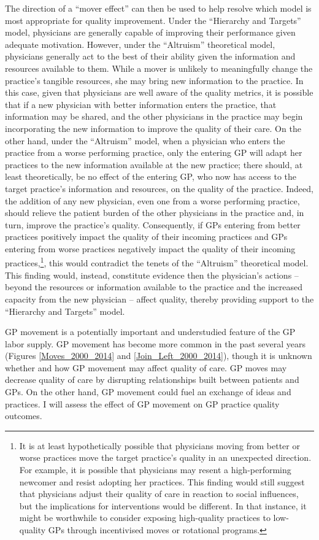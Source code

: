 \documentclass[11pt]{article}
\begin{document}
The direction of a ``mover effect'' can then be used to help resolve which model is most appropriate for quality improvement. Under the ``Hierarchy and Targets'' model, physicians are generally capable of improving their performance given adequate motivation. However, under the ``Altruism'' theoretical model, physicians generally act to the best of their ability given the information and resources available to them. While a mover is unlikely to meaningfully change the practice's tangible resources, she may bring new information to the practice. In this case, given that physicians are well aware of the quality metrics, it is possible that if a new physician with better information enters the practice, that information may be shared, and the other physicians in the practice may begin incorporating the new information to improve the quality of their care. On the other hand, under the ``Altruism'' model, when a physician who enters the practice from a worse performing practice, only the entering GP will adapt her practices to the new information available at the new practice; there should, at least theoretically, be no effect of the entering GP, who now has access to the target practice's information and resources, on the quality of the practice. Indeed, the addition of any new physician, even one from a worse performing practice, should relieve the patient burden of the other physicians in the practice and, in turn, improve the practice's quality. Consequently, if GPs entering from better practices positively impact the quality of their incoming practices and GPs entering from worse practices negatively impact the quality of their incoming practices,\footnote{It is at least hypothetically possible that physicians moving from better or worse practices move the target practice's quality in an unexpected direction. For example, it is possible that physicians may resent a high-performing newcomer and resist adopting her practices. This finding would still suggest that physicians adjust their quality of care in reaction to social influences, but the implications for interventions would be different. In that instance, it might be worthwhile to consider exposing high-quality practices to low-quality GPs through incentivised moves or rotational programs.}, this would contradict the tenets of the ``Altruism'' theoretical model. This finding would, instead, constitute evidence then the physician's actions -- beyond the resources or information available to the practice and the increased capacity from the new physician -- affect quality, thereby providing support to the ``Hierarchy and Targets'' model.

GP movement is a potentially important and understudied feature of the GP labor supply. GP movement has become more common in the past several years (Figures \ref{Moves_2000_2014} and \ref{Join_Left_2000_2014}), though it is unknown whether and how GP movement may affect quality of care. GP moves may decrease quality of care by disrupting relationships built between patients and GPs. On the other hand, GP movement could fuel an exchange of ideas and practices. I will assess the effect of GP movement on GP practice quality outcomes.


\newpage


\end{document}
